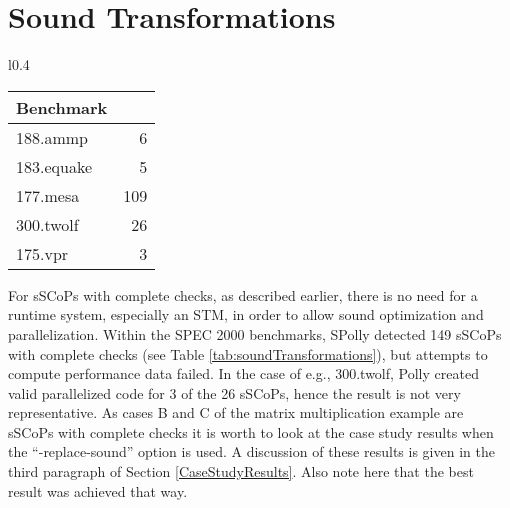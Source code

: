 \section{Sound Transformations}
\label{soundCTtransformations}
\begin{wraptable}[]{l}{0.4\textwidth}
  \vspace*{-9mm}
  \begin{framed}
  \caption{Number of \\sSCoPs with complete checks}
  \centering
    \begin{tabular}{ l | r }
    \textbf{Benchmark} &  \\
      \hline \hline
  188.ammp   & 6 \\
  183.equake & 5  \\
  177.mesa   & 109  \\
  300.twolf  & 26  \\
  175.vpr    & 3  \\
    \end{tabular}
  \vspace*{-1mm}
  \label{tab:soundTransformations}
  \end{framed}
  \vspace*{-13mm}
\end{wraptable}
For sSCoPs with complete checks, as described earlier, 
there is no need for a runtime system, especially an STM, in order 
to allow sound optimization and parallelization. 
Within the SPEC 2000 benchmarks, SPolly detected 149 sSCoPs with complete checks 
(see Table \ref{tab:soundTransformations}), but attempts to compute performance 
data failed. In the case of e.g., 300.twolf, Polly created valid parallelized code for
3 of the 26 sSCoPs, hence the result is not very representative. As cases B and C
of the matrix multiplication example are sSCoPs with complete checks it is worth 
to look at the case study results when the ``-replace-sound'' option is used. 
A discussion of these results is given in the third paragraph of 
Section \ref{CaseStudyResults}. Also note here that the best result was achieved 
that way.
\\

